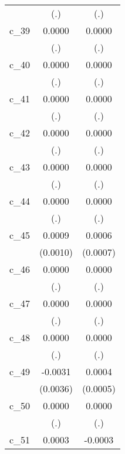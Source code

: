 {\begin{tabular}{l*{2}{c}}
            &         (.)        &         (.)        \\
[1em]
c\_39        &      0.0000        &      0.0000        \\
            &         (.)        &         (.)        \\
[1em]
c\_40        &      0.0000        &      0.0000        \\
            &         (.)        &         (.)        \\
[1em]
c\_41        &      0.0000        &      0.0000        \\
            &         (.)        &         (.)        \\
[1em]
c\_42        &      0.0000        &      0.0000        \\
            &         (.)        &         (.)        \\
[1em]
c\_43        &      0.0000        &      0.0000        \\
            &         (.)        &         (.)        \\
[1em]
c\_44        &      0.0000        &      0.0000        \\
            &         (.)        &         (.)        \\
[1em]
c\_45        &      0.0009        &      0.0006        \\
            &    (0.0010)        &    (0.0007)        \\
[1em]
c\_46        &      0.0000        &      0.0000        \\
            &         (.)        &         (.)        \\
[1em]
c\_47        &      0.0000        &      0.0000        \\
            &         (.)        &         (.)        \\
[1em]
c\_48        &      0.0000        &      0.0000        \\
            &         (.)        &         (.)        \\
[1em]
c\_49        &     -0.0031        &      0.0004        \\
            &    (0.0036)        &    (0.0005)        \\
[1em]
c\_50        &      0.0000        &      0.0000        \\
            &         (.)        &         (.)        \\
[1em]
c\_51        &      0.0003        &     -0.0003        \\

\end{tabular}}
